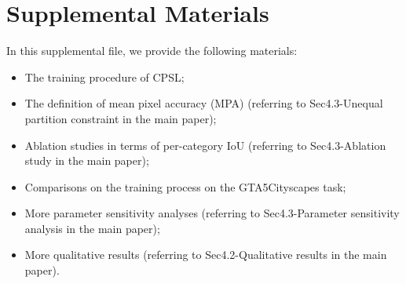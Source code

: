 \documentclass[10pt,twocolumn,letterpaper]{article}
\begin{document}



\clearpage
\section{Supplemental Materials}
	In this supplemental file, we provide the following materials:
	\begin{itemize}\item[] The training procedure of CPSL;
		\item[] The definition of mean pixel accuracy (MPA) (referring to Sec4.3-Unequal partition constraint in the main paper);
		\item[] Ablation studies in terms of per-category IoU (referring to Sec4.3-Ablation study in the main paper);
		\item[] Comparisons on the training process on the GTA5Cityscapes task;
		\item[] More parameter sensitivity analyses (referring to Sec4.3-Parameter sensitivity analysis in the main paper);
		\item[] More qualitative results (referring to Sec4.2-Qualitative results  in the main paper).
	\end{itemize}
\end{document}
